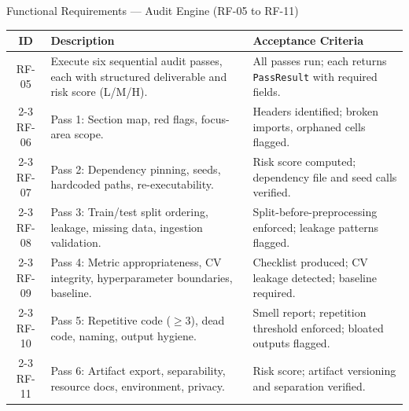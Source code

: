 \documentclass[aspectratio=169,11pt]{beamer}
\begin{document}
\begin{frame}[shrink]{Functional Requirements --- Audit Engine (RF-05 to RF-11)}
  \centering
  \scriptsize
  \renewcommand{\arraystretch}{0.85}
  \begin{tabularx}{\textwidth}{c X p{4.5cm}}
    \toprule
    \textbf{ID} & \textbf{Description} & \textbf{Acceptance Criteria} \\
    \midrule
    RF-05 & Execute six sequential audit passes, each with structured deliverable and risk score (L/M/H). & All passes run; each returns \texttt{PassResult} with required fields. \\
    \cmidrule{2-3}
    RF-06 & Pass 1: Section map, red flags, focus-area scope. & Headers identified; broken imports, orphaned cells flagged. \\
    \cmidrule{2-3}
    RF-07 & Pass 2: Dependency pinning, seeds, hardcoded paths, re-executability. & Risk score computed; dependency file and seed calls verified. \\
    \cmidrule{2-3}
    RF-08 & Pass 3: Train/test split ordering, leakage, missing data, ingestion validation. & Split-before-preprocessing enforced; leakage patterns flagged. \\
    \cmidrule{2-3}
    RF-09 & Pass 4: Metric appropriateness, CV integrity, hyperparameter boundaries, baseline. & Checklist produced; CV leakage detected; baseline required. \\
    \cmidrule{2-3}
    RF-10 & Pass 5: Repetitive code ($\geq$3), dead code, naming, output hygiene. & Smell report; repetition threshold enforced; bloated outputs flagged. \\
    \cmidrule{2-3}
    RF-11 & Pass 6: Artifact export, separability, resource docs, environment, privacy. & Risk score; artifact versioning and separation verified. \\
    \bottomrule
  \end{tabularx}
\end{frame}
\end{document}
